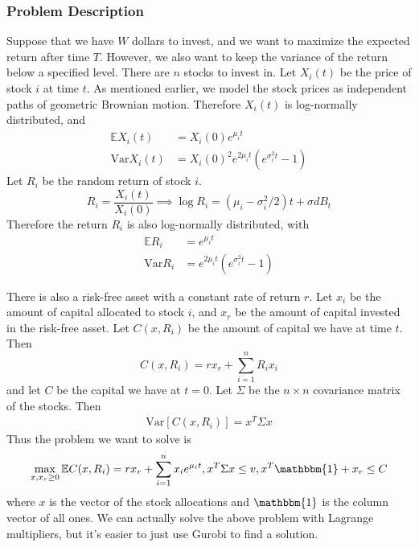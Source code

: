 \documentclass{amsart}
\theoremstyle{definition}
\theoremstyle{remark}
\begin{document}
\subsubsection{Problem Description}
Suppose that we have $W$ dollars to invest, and we want to maximize the expected return after time $T$. However, we also want to keep the variance of the return below a specified level. There are $n$ stocks to invest in. Let $X_i(t)$ be the price of stock $i$ at time $t$. As mentioned earlier, we model the stock prices as independent paths of geometric Brownian motion. Therefore $X_i(t)$ is log-normally distributed, and
\begin{align*}
\mathbb{E} X_i(t) &= X_i(0)e^{\mu_i t}\\
\text{Var} X_i(t) &= X_i(0)^2e^{2\mu_i t}\left(e^{\sigma_i^2 t} -1\right)
\end{align*}
Let $R_i$ be the random return of stock $i$.
\begin{equation*}
R_i = \frac{X_i(t)}{X_i(0)} \implies \log R_i = (\mu_i - \sigma_i^2 / 2) t + \sigma dB_t
\end{equation*}
Therefore the return $R_i$ is also log-normally distributed, with
\begin{align*}
\mathbb{E}R_i &= e^{\mu_i t}\\
\text{Var}R_i &= e^{2\mu_i t}\left(e^{\sigma_i^2 t} -1\right)
\end{align*}

There is also a risk-free asset with a constant rate of return $r$. Let $x_i$ be the amount of capital allocated to stock $i$, and $x_r$ be the amount of capital invested in the risk-free asset. Let $C(x, R_i)$ be the amount of capital we have at time $t$. Then
\begin{equation*}
C(x, R_i) = r x_r + \sum_{i=1}^n R_i x_i 
\end{equation*}
and let $C$ be the capital we have at $t=0$.
Let $\Sigma$ be the $n\times n$ covariance matrix of the stocks. Then
\begin{align*}
\text{Var}[ C(x,R_i)] = x^T \Sigma x
\end{align*}
Thus the problem we want to solve is
\begin{equation}\label{eq:markowitz}
\max_{x,x_r\ge 0} \mathbb{E}C(x, R_i) = r x_r + \sum_{i=1}^n x_i e^{\mu_i t}, x^T \Sigma x \le v, x^T \mathbbm{1} + x_r \le C
\end{equation}
where $x$ is the vector of the stock allocations and $\mathbbm{1}$ is the column vector of all ones.
We can actually solve the above problem with Lagrange multipliers, but it's easier to just use Gurobi to find a solution.
\end{document}
